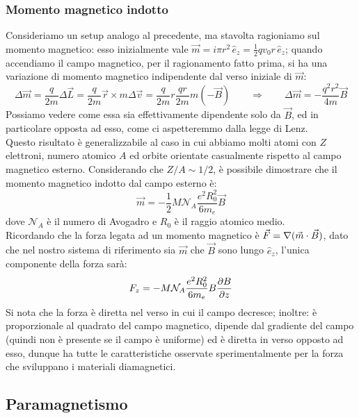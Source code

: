 \subsubsection{Momento magnetico indotto}

Consideriamo un setup analogo al precedente, ma stavolta ragioniamo sul momento magnetico: esso inizialmente vale $ \vec{m} = i \pi r^2 \,\hat{e}_z = \frac{1}{2}qv_0r\,\hat{e}_z $; quando accendiamo il campo magnetico, per il ragionamento fatto prima, si ha una variazione di momento magnetico indipendente dal verso iniziale di $ \vec{m} $:
\begin{equation}
	\Delta\vec{m} = \frac{q}{2m} \Delta\vec{L} = \frac{q}{2m} \vec{r}\times m\Delta\vec{v} = \frac{q}{2m} r\frac{qr}{2m}m(-\vec{B}) \qquad\Longrightarrow\qquad \Delta\vec{m} = - \frac{q^2 r^2}{4m} \vec{B}
	\label{eq:6}
\end{equation}
Possiamo vedere come essa sia effettivamente dipendente solo da $ \vec{B} $, ed in particolare opposta ad esso, come ci aspetteremmo dalla legge di Lenz. \\ 
%
Questo risultato è generalizzabile al caso in cui abbiamo molti atomi con $ Z $ elettroni, numero atomico $ A $ ed orbite orientate casualmente rispetto al campo magnetico esterno. Considerando che $ Z / A \sim 1 / 2 $, è possibile dimostrare che il momento magnetico indotto dal campo esterno è:
\begin{equation}
	\vec{m} = -\frac{1}{2} M \mathcal{N}_A \frac{e^2 R_0^2}{6 m_e} \vec{B}
	\label{eq:7}
\end{equation}
dove $ \mathcal{N}_A $ è il numero di Avogadro e $ R_0 $ è il raggio atomico medio. \\ 
%
Ricordando che la forza legata ad un momento magnetico è $ \vec{F} = \nabla(\vec{m}\cdot\vec{B}) $, dato che nel nostro sistema di riferimento sia $ \vec{m} $ che $ \vec{B} $ sono lungo $ \hat{e}_z $, l'unica componente della forza sarà:
\begin{equation}
	F_z = - M \mathcal{N}_A \frac{e^2 R_0^2}{6 m_e} B \frac{\partial B}{\partial z}
	\label{eq:8}
\end{equation}
Si nota che la forza è diretta nel verso in cui il campo decresce; inoltre: è proporzionale al quadrato del campo magnetico, dipende dal gradiente del campo (quindi non è presente se il campo è uniforme) ed è diretta in verso opposto ad esso, dunque ha tutte le caratteristiche osservate sperimentalmente per la forza che sviluppano i materiali diamagnetici.

\subsection{Paramagnetismo}

